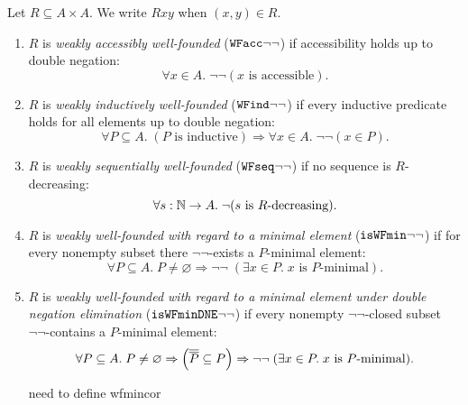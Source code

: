 \begin{definition}
  Let $R \subseteq A \times A$. We write $Rxy$ when $(x,y) \in R$.
  \begin{enumerate}
    \item $R$ is \emph{weakly accessibly well-founded} ($\mathtt{WFacc}{\lnot\lnot}$) if accessibility holds up to double negation:
      \[
        \forall x \in A.\; \lnot \lnot  (x \text{ is accessible}).
      \]
    \item $R$ is \emph{weakly inductively well-founded} ($\mathtt{WFind}{\lnot\lnot}$) if every inductive predicate holds for all elements up to double negation:
      \[
        \forall P \subseteq A.\;(\text{$P$ is inductive}) \Rightarrow \forall x \in A.\; \lnot \lnot (x \in P).
      \]
    \item $R$ is \emph{weakly sequentially well-founded} ($\mathtt{WFseq}{\lnot\lnot}$) if no sequence is $R$-decreasing:
      \[
        \forall s:\mathbb{N} \to A.\; \lnot \text{($s$ is $R$-decreasing)}.
      \]
    \item  $R$ is \emph{weakly well-founded with regard to a minimal element} ($\mathtt{isWFmin}{\lnot\lnot}$) if for every nonempty subset there $\lnot \lnot$-exists a $P$-minimal element:
      \[
        \forall P \subseteq A.\; P \neq \varnothing \Rightarrow \lnot \lnot \;
        (\exists x \in P.\; \text{$x$ is $P$-minimal}).
      \]
    \item  $R$ is \emph{weakly well-founded with regard to a minimal element under double negation elimination} ($\mathtt{isWFminDNE}{\lnot\lnot}$) if every nonempty $\lnot \lnot$-closed subset $\lnot \lnot$-contains a $P$-minimal element:
      \[
        \forall P \subseteq A.\; P \neq \varnothing \Rightarrow \left(\overline{\overline{P}} \subseteq P\right) \Rightarrow \lnot \lnot \;
        (\exists x \in P.\; \text{$x$ is $P$-minimal}).
      \]      
    \item [need to define wfmincor]
  \end{enumerate} 
\end{definition}




